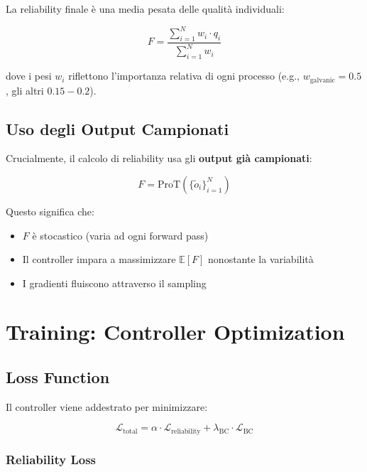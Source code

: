 \documentclass[11pt,a4paper]{article}
\begin{document}
La reliability finale è una media pesata delle qualità individuali:

\begin{equation}
F = \frac{\sum_{i=1}^N w_i \cdot q_i}{\sum_{i=1}^N w_i}
\end{equation}

dove i pesi $w_i$ riflettono l'importanza relativa di ogni processo (e.g., $w_{\text{galvanic}} = 0.5$, gli altri $0.15-0.2$).

\subsection{Uso degli Output Campionati}

Crucialmente, il calcolo di reliability usa gli \textbf{output già campionati}:

\begin{equation}
F = \text{ProT}(\{\tilde{o}_i\}_{i=1}^N)
\end{equation}

Questo significa che:
\begin{itemize}
    \item $F$ è stocastico (varia ad ogni forward pass)
    \item Il controller impara a massimizzare $\mathbb{E}[F]$ nonostante la variabilità
    \item I gradienti fluiscono attraverso il sampling
\end{itemize}

\section{Training: Controller Optimization}

\subsection{Loss Function}

Il controller viene addestrato per minimizzare:

\begin{equation}
\boxed{\mathcal{L}_{\text{total}} = \alpha \cdot \mathcal{L}_{\text{reliability}} + \lambda_{\text{BC}} \cdot \mathcal{L}_{\text{BC}}}
\end{equation}

\subsubsection{Reliability Loss}
\end{document}
